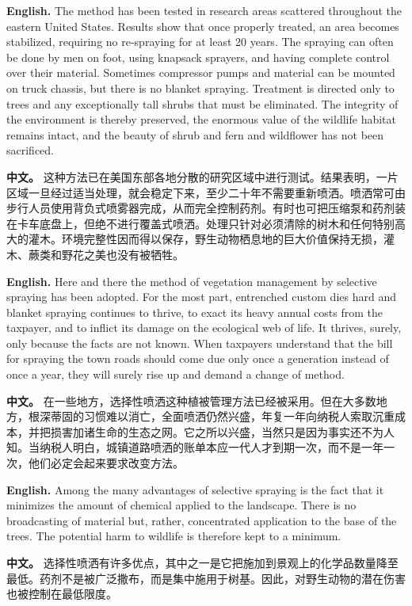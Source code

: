 \noindent\textbf{English.} The method has been tested in research areas scattered throughout the eastern United States. Results show that once properly treated, an area becomes stabilized, requiring no re-spraying for at least 20 years. The spraying can often be done by men on foot, using knapsack sprayers, and having complete control over their material. Sometimes compressor pumps and material can be mounted on truck chassis, but there is no blanket spraying. Treatment is directed only to trees and any exceptionally tall shrubs that must be eliminated. The integrity of the environment is thereby preserved, the enormous value of the wildlife habitat remains intact, and the beauty of shrub and fern and wildflower has not been sacrificed.
\par
\noindent\textbf{中文。} 这种方法已在美国东部各地分散的研究区域中进行测试。结果表明，一片区域一旦经过适当处理，就会稳定下来，至少二十年不需要重新喷洒。喷洒常可由步行人员使用背负式喷雾器完成，从而完全控制药剂。有时也可把压缩泵和药剂装在卡车底盘上，但绝不进行覆盖式喷洒。处理只针对必须清除的树木和任何特别高大的灌木。环境完整性因而得以保存，野生动物栖息地的巨大价值保持无损，灌木、蕨类和野花之美也没有被牺牲。
\par\medskip

\noindent\textbf{English.} Here and there the method of vegetation management by selective spraying has been adopted. For the most part, entrenched custom dies hard and blanket spraying continues to thrive, to exact its heavy annual costs from the taxpayer, and to inflict its damage on the ecological web of life. It thrives, surely, only because the facts are not known. When taxpayers understand that the bill for spraying the town roads should come due only once a generation instead of once a year, they will surely rise up and demand a change of method.
\par
\noindent\textbf{中文。} 在一些地方，选择性喷洒这种植被管理方法已经被采用。但在大多数地方，根深蒂固的习惯难以消亡，全面喷洒仍然兴盛，年复一年向纳税人索取沉重成本，并把损害加诸生命的生态之网。它之所以兴盛，当然只是因为事实还不为人知。当纳税人明白，城镇道路喷洒的账单本应一代人才到期一次，而不是一年一次，他们必定会起来要求改变方法。
\par\medskip

\noindent\textbf{English.} Among the many advantages of selective spraying is the fact that it minimizes the amount of chemical applied to the landscape. There is no broadcasting of material but, rather, concentrated application to the base of the trees. The potential harm to wildlife is therefore kept to a minimum.
\par
\noindent\textbf{中文。} 选择性喷洒有许多优点，其中之一是它把施加到景观上的化学品数量降至最低。药剂不是被广泛撒布，而是集中施用于树基。因此，对野生动物的潜在伤害也被控制在最低限度。
\par\medskip

